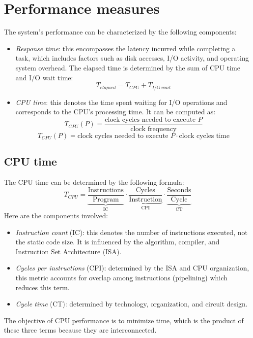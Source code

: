 \section{Performance measures}

The system's performance can be characterized by the following components:
\begin{itemize}
    \item \textit{Response time}: this encompasses the latency incurred while completing a task, which includes factors such as disk accesses, I/O activity, and operating system overhead. 
        The elapsed time is determined by the sum of CPU time and I/O wait time:
        \[T_{elapsed}=T_{CPU} + T_{I/O\: wait}\]
    \item \textit{CPU time}: this denotes the time spent waiting for I/O operations and corresponds to the CPU's processing time. 
        It can be computed as:
        \[T_{CPU}(P) = \dfrac{\text{clock cycles needed to execute } P}{\text{clock frequency}}\] 
        \[T_{CPU}(P) = \text{clock cycles needed to execute } P \cdot \text{clock cycles time}\] 
\end{itemize}

\subsection{CPU time}
The CPU time can be determined by the following formula:
\[T_{CPU}=\underbrace{\dfrac{\text{Instructions}}{\text{Program}}}_{\text{IC}} \cdot \underbrace{\dfrac{\text{Cycles}}{\text{Instruction}}}_{\text{CPI}} \cdot \underbrace{\dfrac{\text{Seconds}}{\text{Cycle}}}_{\text{CT}} \]
Here are the components involved:
\begin{itemize}
    \item \textit{Instruction count} (IC): this denotes the number of instructions executed, not the static code size. 
        It is influenced by the algorithm, compiler, and Instruction Set Architecture (ISA).
    \item \textit{Cycles per instructions} (CPI): determined by the ISA and CPU organization, this metric accounts for overlap among instructions (pipelining) which reduces this term.
    \item \textit{Cycle time} (CT): determined by technology, organization, and circuit design.
\end{itemize}
The objective of CPU performance is to minimize time, which is the product of these three terms because they are interconnected.

